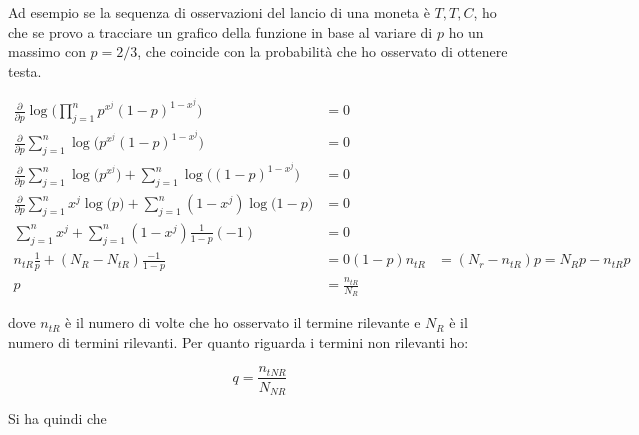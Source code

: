 


Ad esempio se la sequenza di osservazioni del lancio di una moneta è $T,T, C$, ho che se provo a tracciare un grafico della funzione in base al variare di $p$ ho un massimo con $p = 2/3$, che coincide con la probabilità che ho osservato di ottenere testa.

\begin{align*}
	\frac{\partial}{\partial p} \log \Big( \prod\limits_{j = 1}^n p^{x^j}(1-p)^{1-x^j} \Big) &= 0\\
	\frac{\partial}{\partial p} \sum\limits_{j = 1}^n \log \Big( p^{x^j}(1-p)^{1-x^j} \Big) &= 0 \\
	\frac{\partial}{\partial p} \sum\limits_{j = 1}^n \log \Big( p^{x^j}\Big) + \sum\limits_{j = 1}^n \log \Big((1-p)^{1-x^j} \Big) &= 0 \\
	\frac{\partial}{\partial p} \sum\limits_{j = 1}^n x^j \log \Big( p\Big) + \sum\limits_{j = 1}^n (1-x^j)\log \Big(1-p \Big) &= 0 \\
	\sum\limits_{j = 1}^n x^j + \sum\limits_{j = 1}^n (1-x^j) \frac{1}{1-p}(-1)&= 0 \\
	n_{tR} \frac{1}{p} + (N_R - N_{tR})\frac{-1}{1-p} &= 0
	(1-p)n_{tR} &= (N_r - n_{tR}) p  = N_Rp - n_{tR}p\\
	p &= \frac{n_{tR}}{N_R}
\end{align*}

\noindent dove $n_{tR}$ è il numero di volte che ho osservato il termine rilevante e $N_R$ è il numero di termini rilevanti.
Per quanto riguarda i termini non rilevanti ho:

$$
q = \frac{n_{tNR}}{N_{NR}}
$$

\noindent Si ha quindi che 

